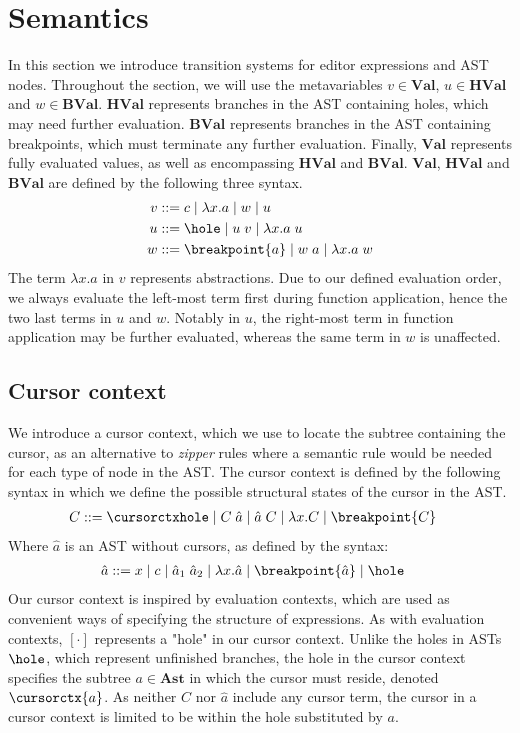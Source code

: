 \section{Semantics}
In this section we introduce transition systems for editor expressions and AST nodes. Throughout the section, we will use the metavariables $v \in \mathbf{Val}$, $u \in \mathbf{HVal}$ and $w \in \mathbf{BVal}$. $\mathbf{HVal}$ represents branches in the AST containing holes, which may need further evaluation. $\mathbf{BVal}$ represents branches in the AST containing breakpoints, which must terminate any further evaluation. Finally, $\mathbf{Val}$ represents fully evaluated values, as well as encompassing $\mathbf{HVal}$ and $\mathbf{BVal}$. $\mathbf{Val}$, $\mathbf{HVal}$ and $\mathbf{BVal}$ are defined by the following three syntax.
\begin{align*}
    v ::=\;& c \mid \lambda x.a \mid w \mid u\\
    u ::=\;& \hole \mid u\; v \mid \lambda x.a\; u\\
    w ::=\;& \breakpoint{a} \mid w\; a \mid \lambda x.a\; w
\end{align*}
The term $\lambda x.a$ in $v$ represents abstractions. Due to our defined evaluation order, we always evaluate the left-most term first during function application, hence the two last terms in $u$ and $w$. Notably in $u$, the right-most term in function application may be further evaluated, whereas the same term in $w$ is unaffected.

\subsection*{Cursor context}
We introduce a cursor context, which we use to locate the subtree containing the cursor, as an alternative to \textit{zipper} rules where a semantic rule would be needed for each type of node in the AST. The cursor context is defined by the following syntax in which we define the possible structural states of the cursor in the AST. 
\begin{align*}
    C ::= \; & \cursorctxhole \mid C\; \hat{a} \mid \hat{a}\; C \mid \lambda x.C \mid \breakpoint{C}
\end{align*}
Where $\hat{a}$ is an AST without cursors, as defined by the syntax:
\begin{align*}
  \hat{a} ::= \; & x \mid c \mid \hat{a}_{1}\;\hat{a}_{2} \mid \lambda x.\hat{a} \mid \breakpoint{\hat{a}} \mid \hole
\end{align*}
Our cursor context is inspired by evaluation contexts, which are used as convenient ways of specifying the structure of expressions. As with evaluation contexts, $\left[\cdot\right]$ represents a "hole" in our cursor context. Unlike the holes in ASTs $\hole$, which represent unfinished branches, the hole in the cursor context specifies the subtree $a \in \mathbf{Ast}$ in which the cursor must reside, denoted $\cursorctx{a}$. As neither $C$ nor $\hat{a}$ include any cursor term, the cursor in a cursor context is limited to be within the hole substituted by $a$.

